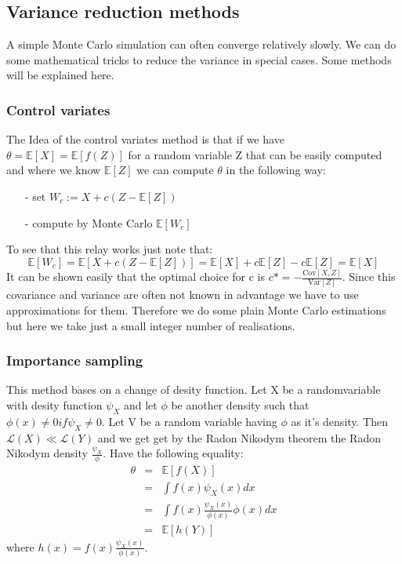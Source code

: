 \documentclass[12pt,a4paper]{scrartcl}
\begin{document}
\subsection{Variance reduction methods}
A simple Monte Carlo simulation can often converge relatively slowly. We can do some mathematical tricks to reduce the variance in special cases. Some methods will be explained here.

\subsubsection{Control variates}
\label{sec:contvar}
The Idea of the control variates method is that if we have $\theta = \mathbb{E}[X] = \mathbb{E}[f(Z)]$ for a random variable Z that can be easily computed and where we know $\mathbb{E}[Z]$ we can compute $\theta$ in the following way:
\begin{itemize}
\item[-] set $W_c := X + c(Z - \mathbb{E}[Z])$
\item[-] compute by Monte Carlo $\mathbb{E}[W_c]$
\end{itemize}
To see that this relay works just note that:
\[
\mathbb{E}[W_c] = \mathbb{E}[X + c(Z - \mathbb{E}[Z])] = \mathbb{E}[X] + c\mathbb{E}[Z] -c\mathbb{E}[Z] = \mathbb{E}[X]
\]
It can be shown easily that the optimal choice for c is $c* = - \frac{\text{Cov}[X,Z]}{\text{Var}[Z]}$. Since this covariance and variance are often not known in advantage we have to use approximations for them. Therefore we do some plain Monte Carlo estimations but here we take just a small integer number of realisations. 

\subsubsection{Importance sampling}
This method bases on a change of desity function. Let X be a randomvariable with desity function $\psi_X$ and let $\phi$ be another density such that $\phi(x) \neq 0 if \psi_X \neq 0$. Let V be a random variable having $\phi$ as it's density. Then $\mathcal{L}(X) \ll \mathcal{L}(Y)$ and we get get by the Radon Nikodym theorem the Radon Nikodym density $\frac{\psi_X}{\phi}$. Have the following equality:
\begin{eqnarray*}
\theta &=& \mathbb{E}[f(X)] \\
&=& \int f(x) \psi_X(x) dx\\
&=& \int f(x) \frac{\psi_X(x)}{\phi(x)} \phi(x) dx\\
&=& \mathbb{E}[h(Y)]
\end{eqnarray*}
where $h(x) = f(x)\frac{\psi_X(x)}{\phi(x)}$.
\end{document}
